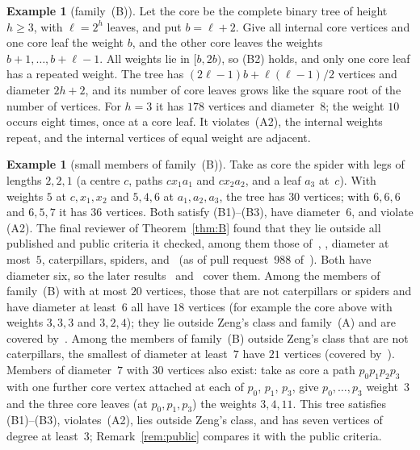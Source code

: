 \documentclass[11pt]{article}
\theoremstyle{definition}
\newtheorem{example}[lemma]{Example}
\theoremstyle{remark}
\begin{document}
\begin{example}[family~(B)]\label{ex:B}
Let the core be the complete binary tree of height $h\ge3$, with $\ell=2^h$
leaves, and put $b=\ell+2$. Give all internal core vertices and one core leaf the
weight $b$, and the other core leaves the weights $b+1,\dots,b+\ell-1$. All
weights lie in $[b,2b)$, so (B2) holds, and only one core leaf has a repeated
weight. The tree has $(2\ell-1)b+\ell(\ell-1)/2$ vertices and diameter $2h+2$,
and its number of core leaves grows like the square root of the number of
vertices. For $h=3$ it has $178$ vertices and diameter~$8$; the weight $10$
occurs eight times, once at a core leaf. It violates~(A2), the internal weights
repeat, and the internal vertices of equal weight are adjacent.
\end{example}

\begin{example}[small members of family~(B)]\label{ex:small}
Take as core the spider with legs of lengths $2,2,1$ (a centre $c$, paths
$c x_1 a_1$ and $c x_2 a_2$, and a leaf $a_3$ at~$c$). With weights $5$ at $c,x_1,x_2$
and $5,4,6$ at $a_1,a_2,a_3$, the tree has $30$ vertices; with $6,6,6$ and
$6,5,7$ it has $36$ vertices. Both satisfy (B1)--(B3), have diameter~$6$, and
violate (A2). The final reviewer of Theorem~\ref{thm:B} found that they lie
outside all published and public criteria it checked, among them those
of~\cite{zeng,awan}, \cite[Corollary~5.15]{got}, diameter at most~$5$,
caterpillars, spiders, \cite{aur} and~\cite{sc} (as of pull request~988
of~\cite{sc}). Both have diameter six, so the later
results~\cite{kyf} and~\cite[pull request~1081]{sc} cover them. Among the members
of family~(B) with at most $20$ vertices, those that are not caterpillars or
spiders and have diameter at least~$6$ all have $18$ vertices (for example the
core above with weights $3,3,3$ and $3,2,4$); they lie outside Zeng's class and
family~(A) and are covered by~\cite{hj}. Among the members of family~(B) outside
Zeng's class that are not caterpillars, the smallest of diameter at least~$7$
have $21$ vertices (covered by~\cite{hj}). Members of diameter~$7$ with $30$
vertices also exist: take as core a path $p_0p_1p_2p_3$ with one further core
vertex attached at each of $p_0$, $p_1$, $p_3$, give $p_0,\dots,p_3$ weight~$3$
and the three core leaves (at $p_0,p_1,p_3$) the weights $3,4,11$. This tree
satisfies (B1)--(B3), violates~(A2), lies outside Zeng's class, and has seven
vertices of degree at least~$3$; Remark~\ref{rem:public} compares it with the
public criteria.
\end{example}
\end{document}
